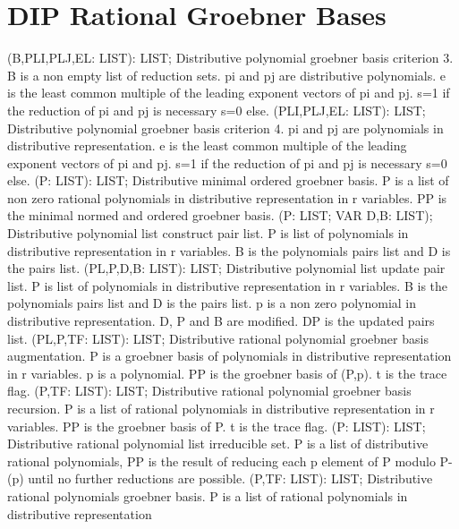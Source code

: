 \section{ DIP Rational Groebner Bases  } 
 (B,PLI,PLJ,EL: LIST): LIST; \eproc
\bcom Distributive polynomial groebner basis criterion 3.
B is a non empty list of reduction sets. pi and pj are
distributive polynomials. e is the least common multiple
of the leading exponent vectors of pi and pj. s=1 if the
reduction of pi and pj is necessary s=0 else.  \ecom 
{} (PLI,PLJ,EL: LIST): LIST; \eproc
\bcom Distributive polynomial groebner basis criterion 4.
pi and pj are polynomials in distributive representation.
e is the least common multiple of the leading exponent vectors
of pi and pj. s=1 if the reduction of pi and pj is necessary
s=0 else.  \ecom 
{} (P: LIST): LIST; \eproc
\bcom Distributive minimal ordered groebner basis. P is a list of
non zero rational polynomials in distributive representation
in r variables. PP is the minimal normed and ordered
groebner basis.  \ecom 
{} (P: LIST; VAR D,B: LIST); \eproc
\bcom Distributive polynomial list construct pair list.
P is list of polynomials in distributive representation
in r variables. B is the polynomials pairs list and
D is the pairs list.  \ecom 
{} (PL,P,D,B: LIST): LIST; \eproc
\bcom Distributive polynomial list update pair list.
P is list of polynomials in distributive representation
in r variables. B is the polynomials pairs list and
D is the pairs list. p is a non zero polynomial in
distributive representation. D, P and B are modified.
DP is the updated pairs list.  \ecom 
{} (PL,P,TF: LIST): LIST; \eproc
\bcom Distributive rational polynomial groebner basis augmentation.
P is a groebner basis of polynomials in distributive
representation in r variables. p is a polynomial. PP is the
groebner basis of (P,p). t is the trace flag. \ecom 
{} (P,TF: LIST): LIST; \eproc
\bcom Distributive rational polynomial groebner basis recursion.
P is a list of rational polynomials in distributive representation
in r variables. PP is the groebner basis of P. t is the
trace flag. \ecom 
{} (P: LIST): LIST; \eproc
\bcom Distributive rational polynomial list irreducible set.
P is a list of distributive rational polynomials,
PP is the result of reducing each p element of P modulo P-(p)
until no further reductions are possible.  \ecom 
{} (P,TF: LIST): LIST; \eproc
\bcom Distributive rational polynomials groebner basis.
P is a list of rational polynomials in distributive representation
